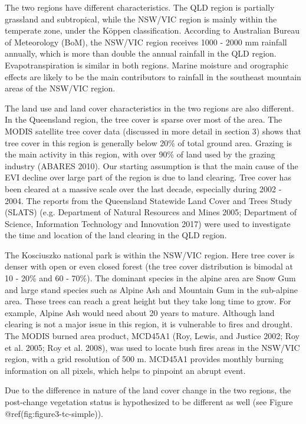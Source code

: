 \documentclass[fleqn,10pt,lineno]{wlpeerj} %
\begin{document}
The two regions have different characteristics. The QLD region is
partially grassland and subtropical, while the NSW/VIC region is mainly
within the temperate zone, under the Köppen classification. According to
Australian Bureau of Meteorology (BoM), the NSW/VIC region receives 1000
- 2000 mm rainfall annually, which is more than double the annual
rainfall in the QLD region. Evapotranspiration is similar in both
regions. Marine moisture and orographic effects are likely to be the
main contributors to rainfall in the southeast mountain areas of the
NSW/VIC region.

The land use and land cover characteristics in the two regions are also
different. In the Queensland region, the tree cover is sparse over most
of the area. The MODIS satellite tree cover data (discussed in more
detail in section 3) shows that tree cover in this region is generally
below 20\% of total ground area. Grazing is the main activity in this
region, with over 90\% of land used by the grazing industry (ABARES
2010). Our starting assumption is that the main cause of the EVI decline
over large part of the region is due to land clearing. Tree cover has
been cleared at a massive scale over the last decade, especially during
2002 - 2004. The reports from the Queensland Statewide Land Cover and
Trees Study (SLATS) (e.g. Department of Natural Resources and Mines
2005; Department of Science, Information Technology and Innovation 2017)
were used to investigate the time and location of the land clearing in
the QLD region.

The Kosciuszko national park is within the NSW/VIC region. Here tree
cover is denser with open or even closed forest (the tree cover
distribution is bimodal at 10 - 20\% and 60 - 70\%). The dominant
species in the alpine area are Snow Gum and large stand species such as
Alpine Ash and Mountain Gum in the sub-alpine area. These trees can
reach a great height but they take long time to grow. For example,
Alpine Ash would need about 20 years to mature. Although land clearing
is not a major issue in this region, it is vulnerable to fires and
drought. The MODIS burned area product, MCD45A1 (Roy, Lewis, and Justice
2002; Roy et al. 2005; Roy et al. 2008), was used to locate bush fires
areas in the NSW/VIC region, with a grid resolution of 500 m. MCD45A1
provides monthly burning information on all pixels, which helps to
pinpoint an abrupt event.

Due to the difference in nature of the land cover change in the two
regions, the post-change vegetation status is hypothesized to be
different as well (see Figure @ref(fig:figure3-tc-simple)).
\end{document}
